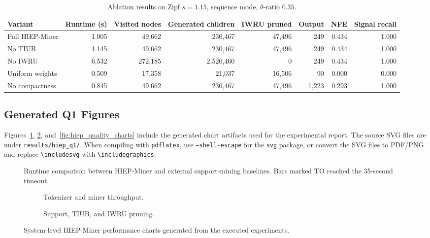 \documentclass[11pt,a4paper]{article}
\begin{document}
\begin{table}[H]
\centering
\caption{Ablation results on Zipf \(s=1.15\), sequence mode, \(\theta\)-ratio \(0.35\).}
\label{tab:hiep_ablation_results}
\small
\begin{adjustbox}{max width=\textwidth}
\begin{tabular}{lrrrrrrr}
\toprule
Variant & Runtime (s) & Visited nodes & Generated children & IWRU pruned & Output & NFE & Signal recall \\
\midrule
Full HIEP-Miner & 1.005 & 49,662 & 230,467 & 47,496 & 249 & 0.434 & 1.000 \\
No TIUB & 1.145 & 49,662 & 230,467 & 47,496 & 249 & 0.434 & 1.000 \\
No IWRU & 6.532 & 272,185 & 2,520,460 & 0 & 249 & 0.434 & 1.000 \\
Uniform weights & 0.509 & 17,358 & 21,037 & 16,506 & 90 & 0.000 & 0.000 \\
No compactness & 0.845 & 49,662 & 230,467 & 47,496 & 1,223 & 0.293 & 1.000 \\
\bottomrule
\end{tabular}
\end{adjustbox}
\end{table}

\subsection{Generated Q1 Figures}

Figures~\ref{fig:hiep_external_baseline_runtime}, \ref{fig:hiep_system_charts}, and~\ref{fig:hiep_quality_charts} include the generated chart artifacts used for the experimental report. The source SVG files are under \texttt{results/hiep\_q1/}. When compiling with \texttt{pdflatex}, use \texttt{--shell-escape} for the \texttt{svg} package, or convert the SVG files to PDF/PNG and replace \texttt{\textbackslash includesvg} with \texttt{\textbackslash includegraphics}.

\begin{figure}[H]
\centering

\caption{Runtime comparison between HIEP-Miner and external support-mining baselines. Bars marked TO reached the 35-second timeout.}
\label{fig:hiep_external_baseline_runtime}
\end{figure}

\begin{figure}[H]
\centering
\begin{subfigure}{0.48\textwidth}
    \centering
    
    \caption{Tokenizer and miner throughput.}
\end{subfigure}
\hfill
\begin{subfigure}{0.48\textwidth}
    \centering
    
    \caption{Support, TIUB, and IWRU pruning.}
\end{subfigure}
\caption{System-level HIEP-Miner performance charts generated from the executed experiments.}
\label{fig:hiep_system_charts}
\end{figure}
\end{document}
